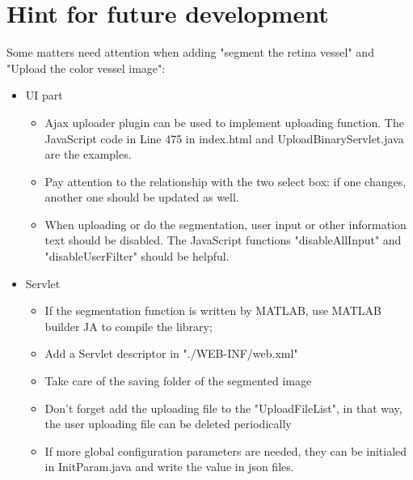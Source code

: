 \documentclass[a4paper]{article}
\begin{document}
	
\section{Hint for future development}
Some matters need attention when adding "segment the retina vessel" and "Upload the color vessel image":
\begin{itemize}
\item UI part
	\begin{itemize}
	\item Ajax uploader plugin can be used to implement uploading function. The JavaScript code in Line 475 in index.html and UploadBinaryServlet.java are the examples.
	\item Pay attention to the relationship with the two select box: if one changes, another one should be updated as well.
	\item When uploading or do the segmentation, user input or other information text should be disabled. The JavaScript functions "disableAllInput" and "disableUserFilter" should be helpful.  
	\end{itemize}
\item Servlet
	\begin{itemize}
	\item If the segmentation function is written by MATLAB, use MATLAB builder JA to compile the library; 
	\item Add a Servlet descriptor in "./WEB-INF/web.xml"
	\item Take care of the saving folder of the segmented image
	\item Don't forget add the uploading file to the "UploadFileList", in that way, the user uploading file can be deleted periodically
	\item If more global configuration parameters are needed, they can be initialed in InitParam.java and write the value in json files.
	\end{itemize}
\end{itemize}

\pagebreak
\end{document}
